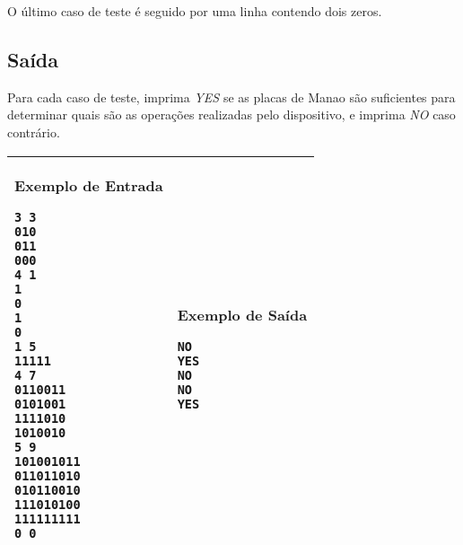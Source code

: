 O último caso de teste é seguido por uma linha contendo dois zeros.

\subsection*{Saída}

Para cada caso de teste, imprima \textit{YES} se as placas de Manao são
suficientes para determinar quais são as operações realizadas pelo dispositivo, e imprima \textit{NO} caso contrário.

\newpage

\begin{table}[!h]
\centering
\begin{tabular}{|l|l|}
\hline
\begin{minipage}[t]{3in}
\textbf{Exemplo de Entrada}
\begin{verbatim}
3 3
010
011
000
4 1
1
0
1
0
1 5
11111
4 7
0110011
0101001
1111010
1010010
5 9
101001011
011011010
010110010
111010100
111111111
0 0
\end{verbatim}
\vspace{1mm}
\end{minipage}
&

\begin{minipage}[t]{3in}
\textbf{Exemplo de Saída}
\begin{verbatim}
NO
YES
NO
NO
YES
\end{verbatim}
\vspace{1mm}
\end{minipage} \\
\hline
\end{tabular}
\end{table}

\newpage
